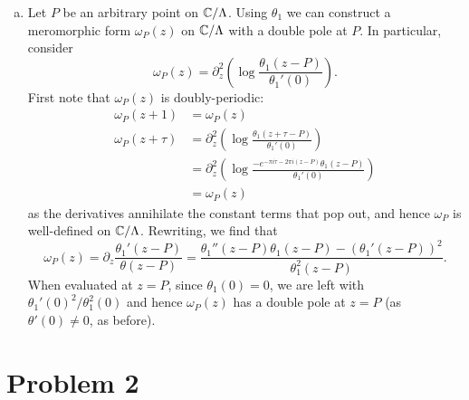 \documentclass{../mathnotes}
\begin{document}
\begin{enumerate}[(a)]

    \item Let $P$ be an arbitrary point on $\mathbb{C}/\Lambda$. Using $\theta_1$ we can construct a meromorphic form $\omega_{P}(z)$ on $\mathbb{C}/\Lambda$ with
        a double pole at $P$. In particular, consider
        \[\omega_{P}(z)=\partial_z^2\left( \log \frac{\theta_1(z-P)}{\theta_1'(0)} \right).\]
        First note that $\omega_{P}(z)$ is doubly-periodic:
        \begin{align*}
            \omega_{P}(z+1)&=\omega_{P}(z)\\
            \omega_{P}(z+\tau)&=\partial_z^2\left( \log\frac{\theta_1(z+\tau-P)}{\theta_1'(0)} \right)\\
            &=\partial_z^2\left( \log\frac{-e^{-\pi i \tau-2\pi i (z-P)}\theta_1(z-P)}{\theta_1'(0)} \right)\\
            &=\omega_{P}(z)
        \end{align*}
        as the derivatives annihilate the constant terms that pop out, and hence $\omega_{P}$ is well-defined on $\mathbb{C}/\Lambda$. Rewriting, we find that
        \[\omega_{P}(z)=\partial_z\frac{\theta_1'(z-P)}{\theta(z-P)}=\frac{\theta_1''(z-P)\theta_1(z-P)-(\theta_1'(z-P))^2}{\theta_1^2(z-P)}.\]
        When evaluated at $z=P$, since $\theta_1(0)=0$, we are left with $\theta_1'(0)^2/\theta_1^2(0)$ and hence $\omega_P(z)$ has a double pole at
        $z=P$ (as $\theta'(0)\neq 0$, as before).
\end{enumerate}

\section*{Problem 2}        
\end{document}
